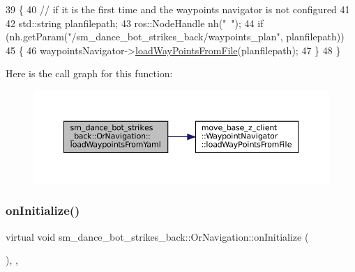 \begin{DoxyCode}
39     \{
40         \textcolor{comment}{// if it is the first time and the waypoints navigator is not configured}
41 
42         std::string planfilepath;
43         ros::NodeHandle nh(\textcolor{stringliteral}{"~"});
44         \textcolor{keywordflow}{if} (nh.getParam(\textcolor{stringliteral}{"/sm\_dance\_bot\_strikes\_back/waypoints\_plan"}, planfilepath))
45         \{
46             waypointsNavigator->\hyperlink{classmove__base__z__client_1_1WaypointNavigator_af56d146945280a8660805aad7eb3aed9}{loadWayPointsFromFile}(planfilepath);
47         \}
48     \}
\end{DoxyCode}
Here is the call graph for this function\+:
\nopagebreak
\begin{figure}[H]
\begin{center}
\leavevmode
\includegraphics[width=350pt]{classsm__dance__bot__strikes__back_1_1OrNavigation_abd8811831075be61ad28fe4a68fc738d_cgraph}
\end{center}
\end{figure}
\mbox{\label{classsm__dance__bot__strikes__back_1_1OrNavigation_a458a0c5fed04b9906c6943f1e7ac5bf0}} 
\subsubsection{\texorpdfstring{on\+Initialize()}{onInitialize()}}
{\footnotesize\ttfamily virtual void sm\+\_\+dance\+\_\+bot\+\_\+strikes\+\_\+back\+::\+Or\+Navigation\+::on\+Initialize (\begin{DoxyParamCaption}{ }\end{DoxyParamCaption})\hspace{0.3cm}{\ttfamily [inline]}, {\ttfamily [override]}, {\ttfamily [virtual]}}



